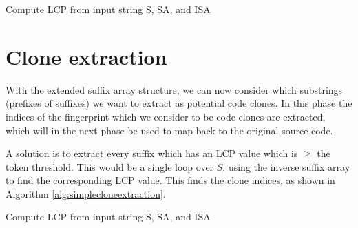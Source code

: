 \begin{algorithm}[htp]
  \SetAlgoLined\DontPrintSemicolon

  \vspace{0.5cm}
  \caption{Compute LCP from input string S, SA, and ISA}
  \label{alg:lcp}
\end{algorithm}


\section{Clone extraction}

With the extended suffix array structure, we can now consider which substrings (prefixes
of suffixes) we want to extract as potential code clones. In this phase the indices of the
fingerprint which we consider to be code clones are extracted, which will in the next
phase be used to map back to the original source code.

A solution is to extract every suffix which has an LCP value which is $\geq$ the token
threshold. This would be a single loop over $S$, using the inverse suffix array to find
the corresponding LCP value. This finds the clone indices, as shown in Algorithm
\ref{alg:simplecloneextraction}.

\begin{algorithm}[htp]
  \SetAlgoLined\DontPrintSemicolon

  \vspace{0.5cm}
  \caption{Compute LCP from input string S, SA, and ISA}
  \label{alg:simplecloneextraction}
\end{algorithm}

